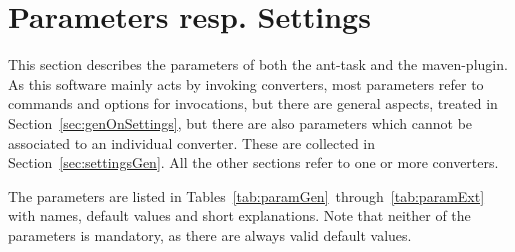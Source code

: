 
\chapter{Parameters resp. Settings}\label{chap:settings}

This section describes the parameters 
of both the ant-task and the maven-plugin. 
As this software mainly acts by invoking converters, 
most parameters refer to commands and options for invocations, 
but there are general aspects, treated in Section~\ref{sec:genOnSettings}, 
but there are also parameters which cannot be associated to an individual converter. 
These are collected in Section~\ref{sec:settingsGen}. 
All the other sections refer to one or more converters. 

The parameters are listed 
in Tables~\ref{tab:paramGen}~through~\ref{tab:paramExt} 
with names, default values and short explanations. 
Note that neither of the parameters is mandatory, 
as there are always valid default values. 

